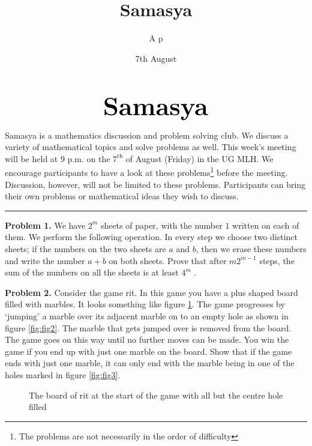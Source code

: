 \documentclass[10pt,a4paper,notitlepage]{article}
\title{Samasya}
\author{A p}
\date{7th August}
\begin{document}

$$\mathrm{\textbf{\fontsize{30}{40}\selectfont Samasya}}$$

Samasya is a mathematics discussion and problem solving club. We discuss a variety of mathematical topics and solve problems as well. This week's meeting will be held at 9 p.m. on the $7^\mathrm{th}$ of August (Friday) in the UG MLH. We encourage participants to have a look at these problems\footnote{The problems are not necessarily in the order of difficulty} before the meeting. Discussion, however, will not be limited  to these problems. Participants can bring their own problems or mathematical ideas they wish to discuss.
\\
\hrule

\textbf{Problem 1.}
We have $2^m$ sheets of paper, with the number $1$ written on each of them. We perform the following operation. In every step we choose two distinct sheets; if the numbers on the two sheets are $a$ and $b$, then we erase these numbers and write the number $a + b$ on both sheets. Prove that after $m2^{m -1}$ steps, the sum of the numbers on all the sheets is at least $4^m$ .

\textbf{Problem 2.}
Consider the game rit. In this game you have a plus shaped board filled with marbles. It looks something like figure \ref{fig:fig1}.
The game progresses by `jumping' a marble over its adjacent marble on to an empty hole as shown in figure \ref{fig:fig2}. The marble that gets jumped over is removed from the board. The game goes on this way until no further moves can be made. You win the game if you end up with just one marble on the board. Show that if the game ends with just one marble, it can only end with the marble being in one of the holes marked in figure \ref{fig:fig3}.
\begin{figure}[h]
\centering
{}
\caption{The board of rit at the start of the game with all but the centre hole filled}
\label{fig:fig1}
\end{figure}
\end{document}
